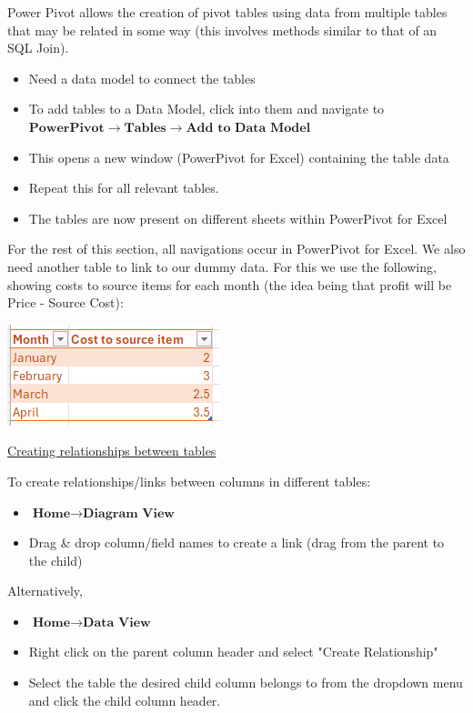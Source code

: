 \documentclass[8pt]{extarticle}
\begin{document}
\begin{multicols}{3}
Power Pivot allows the creation of pivot tables using data from multiple tables that may be related in some way (this involves methods similar to that of an SQL Join).

\begin{itemize}
    \item Need a data model to connect the tables
    \item To add tables to a Data Model, click into them and navigate to $\textbf{PowerPivot} \rightarrow \textbf{Tables} \rightarrow \textbf{Add to Data Model}$
    \item This opens a new window (PowerPivot for Excel) containing the table data
    \item Repeat this for all relevant tables.
    \item The tables are now present on different sheets within PowerPivot for Excel
\end{itemize}

For the rest of this section, all navigations occur in PowerPivot for Excel. We also need another table to link to our dummy data. For this we use the following, showing costs to source items for each month (the idea being that profit will be Price - Source Cost):
\begin{center}
    \includegraphics[width=0.6\columnwidth]{images/dummy2.png}
\end{center}

\begin{center}
    \underline{Creating relationships between tables}
\end{center}
To create relationships/links between columns in different tables:
\begin{itemize}
    \item $\textbf{Home} \rightarrow \textbf{Diagram View}$
    \item Drag \& drop column/field names to create a link (drag from the parent to the child)
\end{itemize}
Alternatively,
\begin{itemize}
    \item $\textbf{Home} \rightarrow \textbf{Data View}$
    \item Right click on the parent column header and select "Create Relationship"
    \item Select the table the desired child column belongs to from the dropdown menu and click the child column header.
\end{itemize}


\end{multicols}
\end{document}
